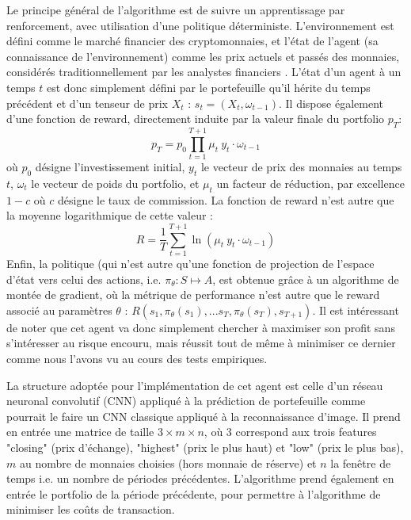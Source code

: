 \documentclass[a4paper, 10pt]{article}
\begin{document}
Le principe général de l'algorithme est de suivre un apprentissage par renforcement, avec utilisation d'une politique déterministe. L'environnement est défini comme le marché financier des cryptomonnaies, et l'état de l'agent (sa connaissance de l'environnement) comme les prix actuels et passés des monnaies, considérés traditionnellement par les analystes financiers \cite{Lo2000}. L'état d'un agent à un temps $t$ est donc simplement défini par le portefeuille qu'il hérite du temps précédent et d'un tenseur de prix $X_t$ : $s_t = (X_t, \omega_{t-1})$. Il dispose également d'une fonction de reward, directement induite par la valeur finale du portfolio $p_T$:
\begin{equation}
    p_T = p_0 \prod_{t=1}^{T+1} \mu_t \ y_t \cdot \omega_{t-1}
\label{eq:valeur_finale}
\end{equation}
où $p_0$ désigne l'investissement initial, $y_t$ le vecteur de prix des monnaies au temps $t$, $\omega_t$ le vecteur de poids du portfolio, et $\mu_t$ un facteur de réduction, par excellence $1 - c$ où $c$ désigne le taux de commission. La fonction de reward n'est autre que la moyenne logarithmique de cette valeur :
\begin{equation}
    R = \frac{1}{T} \sum_{t=1}^{T+1} \ln(\mu_t \ y_t \cdot \omega_{t-1})
\end{equation}
Enfin, la politique (qui n'est autre qu'une fonction de projection de l'espace d'état vers celui des actions, i.e. $\pi_{\theta} : S \mapsto A$, est obtenue grâce à un algorithme de montée de gradient, où la  métrique de performance n'est autre que le reward associé au paramètres $\theta$ : $R(s_1, \pi_{\theta} (s_1), ...s_T, \pi_{\theta} (s_T), s_{T+1})$. Il est intéressant de noter que cet agent va donc simplement chercher à maximiser son profit sans s'intéresser au risque encouru, mais réussit tout de même à minimiser ce dernier comme nous l'avons vu au cours des tests empiriques.

La structure adoptée pour l'implémentation de cet agent est celle d'un réseau neuronal convolutif (CNN) appliqué à la prédiction de portefeuille comme pourrait le faire un CNN classique appliqué à la reconnaissance d'image. Il prend en entrée une matrice de taille $3 \times m \times n$, où 3 correspond aux trois features "closing" (prix d'échange), "highest" (prix le plus haut) et "low" (prix le plus bas), $m$ au nombre de monnaies choisies (hors monnaie de réserve) et $n$ la fenêtre de temps i.e. un nombre de périodes précédentes. L'algorithme prend également en entrée le portfolio de la période précédente, pour permettre à l'algorithme de minimiser les coûts de transaction.
\end{document}
